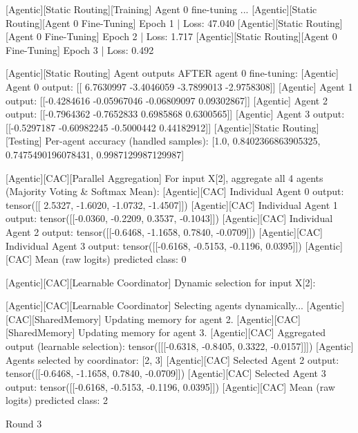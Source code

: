 [Agentic][Static Routing][Training] Agent 0 fine-tuning ...
[Agentic][Static Routing][Agent 0 Fine-Tuning] Epoch 1 | Loss: 47.040
[Agentic][Static Routing][Agent 0 Fine-Tuning] Epoch 2 | Loss: 1.717
[Agentic][Static Routing][Agent 0 Fine-Tuning] Epoch 3 | Loss: 0.492

[Agentic][Static Routing] Agent outputs AFTER agent 0 fine-tuning:
[Agentic] Agent 0 output: [[ 6.7630997 -3.4046059 -3.7899013 -2.9758308]]
[Agentic] Agent 1 output: [[-0.4284616  -0.05967046 -0.06809097  0.09302867]]
[Agentic] Agent 2 output: [[-0.7964362 -0.7652833  0.6985868  0.6300565]]
[Agentic] Agent 3 output: [[-0.5297187  -0.60982245 -0.5000442   0.44182912]]
[Agentic][Static Routing][Testing] Per-agent accuracy (handled samples): [1.0, 0.8402366863905325, 0.7475490196078431, 0.9987129987129987]

[Agentic][CAC][Parallel Aggregation] For input X[2], aggregate all 4 agents (Majority Voting & Softmax Mean):
[Agentic][CAC] Individual Agent 0 output: tensor([[ 2.5327, -1.6020, -1.0732, -1.4507]])
[Agentic][CAC] Individual Agent 1 output: tensor([[-0.0360, -0.2209,  0.3537, -0.1043]])
[Agentic][CAC] Individual Agent 2 output: tensor([[-0.6468, -1.1658,  0.7840, -0.0709]])
[Agentic][CAC] Individual Agent 3 output: tensor([[-0.6168, -0.5153, -0.1196,  0.0395]])
[Agentic][CAC] Mean (raw logits) predicted class: 0

[Agentic][CAC][Learnable Coordinator] Dynamic selection for input X[2]:

[Agentic][CAC][Learnable Coordinator] Selecting agents dynamically...
[Agentic][CAC][SharedMemory] Updating memory for agent 2.
[Agentic][CAC][SharedMemory] Updating memory for agent 3.
[Agentic][CAC] Aggregated output (learnable selection): tensor([[[-0.6318, -0.8405,  0.3322, -0.0157]]])
[Agentic] Agents selected by coordinator: [2, 3]
[Agentic][CAC] Selected Agent 2 output: tensor([[-0.6468, -1.1658,  0.7840, -0.0709]])
[Agentic][CAC] Selected Agent 3 output: tensor([[-0.6168, -0.5153, -0.1196,  0.0395]])
[Agentic][CAC] Mean (raw logits) predicted class: 2

Round 3

